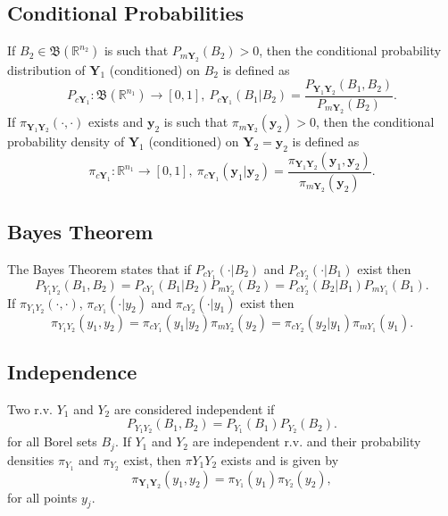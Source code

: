 \subsection{Conditional Probabilities}

If $B_2\in\mathfrak{B}(\mathbb{R}^{n_2})$ is such that $P_{m\mathbf{Y}_2}(B_2)>0$, then the
conditional probability distribution of $\mathbf{Y}_1$ (conditioned) on $B_2$ is defined as
\begin{equation*}
P_{c\mathbf{Y}_1}:\mathfrak{B}(\mathbb{R}^{n_1})\rightarrow [0,1],~
P_{c\mathbf{Y}_1}(B_1|B_2)
=
\frac
{P_{\mathbf{Y}_1\mathbf{Y}_2}(B_1,B_2)}
{P_{m\mathbf{Y}_2}(B_2)}.
\end{equation*}
%
If $\pi_{\mathbf{Y}_1\mathbf{Y}_2}(\cdot,\cdot)$ exists and $\mathbf{y}_2$ is such that $\pi_{m\mathbf{Y}_2}(\mathbf{y}_2)>0$, then the
conditional probability density of $\mathbf{Y}_1$ (conditioned) on $\mathbf{Y}_2=\mathbf{y}_2$ is defined as
\begin{equation*}
\pi_{c\mathbf{Y}_1}:\mathbb{R}^{n_1}\rightarrow [0,1],~
\pi_{c\mathbf{Y}_1}(\mathbf{y}_1|\mathbf{y}_2)
=
\frac
{\pi_{\mathbf{Y}_1\mathbf{Y}_2}(\mathbf{y}_1,\mathbf{y}_2)}
{\pi_{m\mathbf{Y}_2}(\mathbf{y}_2)}.
\end{equation*}

\subsection{Bayes Theorem}

The Bayes Theorem \cite{KaSo05} states that
if $P_{cY_1}(\cdot|B_2)$ and $P_{cY_2}(\cdot|B_1)$ exist then
\begin{equation}\label{eq-Bayes-1}
P_{Y_1Y_2}(B_1,B_2) = P_{cY_1}(B_1|B_2)P_{mY_2}(B_2) = P_{cY_2}(B_2|B_1)P_{mY_1}(B_1).
\end{equation}
If $\pi_{Y_1Y_2}(\cdot,\cdot)$, $\pi_{cY_1}(\cdot|y_2)$ and $\pi_{cY_2}(\cdot|y_1)$ exist then
\begin{equation}\label{eq-Bayes-2}
\pi_{Y_1Y_2}(y_1,y_2) = \pi_{cY_1}(y_1|y_2)\pi_{mY_2}(y_2) = \pi_{cY_2}(y_2|y_1)\pi_{mY_1}(y_1).
\end{equation}

\subsection{Independence}

Two r.v. $Y_1$ and $Y_2$ are considered independent if
\begin{equation*}
P_{Y_1Y_2}(B_1,B_2) = P_{Y_1}(B_1)P_{Y_2}(B_2).
\end{equation*}
for all Borel sets $B_j$.
If $Y_1$ and $Y_2$ are independent r.v. and
their probability densities $\pi_{Y_1}$ and $\pi_{Y_2}$ exist,
then $\pi{Y_1Y_2}$ exists and is given by
\begin{equation*}
\pi_{\mathbf{Y}_1\mathbf{Y}_2}(y_1,y_2) = \pi_{Y_1}(y_1)\pi_{Y_2}(y_2),
\end{equation*}
for all points $y_j$.

